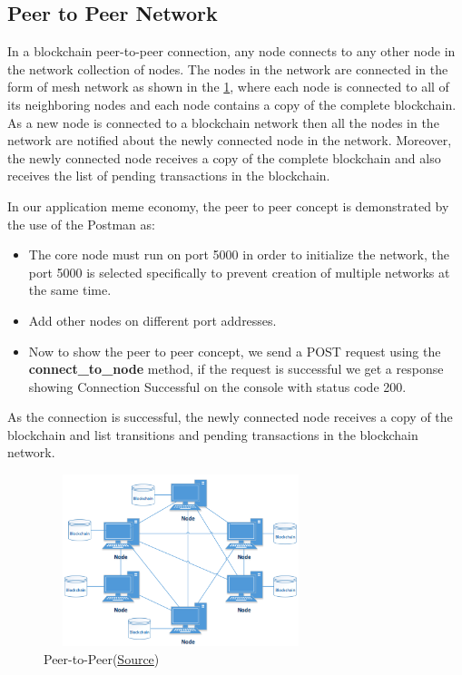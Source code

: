 \documentclass[12pt]{article}
\begin{document}
\subsection{Peer to Peer Network} %
In a blockchain peer-to-peer connection, any node connects to any other node in the network collection of nodes. The nodes in the network are connected in the form of mesh network as shown in the \ref{fig:P2P}, where each node is connected to all of its neighboring nodes and each node contains a copy of the complete blockchain. As a new node is connected to a blockchain network then all the nodes in the network are notified about the newly connected node in the network. Moreover, the newly connected node receives a copy of the complete blockchain and also receives the list of pending transactions in the blockchain. \par
\begin{flushleft}

In our application meme economy, the peer to peer concept is demonstrated by the use of the Postman as:
\begin{itemize}
    \item The core node must run on port 5000 in order to initialize the network, the port 5000 is selected specifically to prevent creation of multiple networks at the same time.
    \item Add other nodes on different port addresses.
    \item Now to show the peer to peer concept, we send a POST request using the \textbf{connect\_to\_node} method, if the request is successful we get a response showing Connection Successful on the console with status code 200.
\end{itemize}
\end{flushleft}
As the connection is successful, the newly connected node receives a copy of the blockchain and list transitions and pending transactions in the blockchain network.
\begin{figure}[H]
    \centering
    \includegraphics[width=8cm, height=5cm]{../report_MemeEcon/images/p2p.png}
    \caption{Peer-to-Peer(\href{https://www.researchgate.net/publication/320127088_Blockchain_Implementation_Quality_Challenges_A_Literature_Review/figures?lo=1&utm_source=google&utm_medium=organic}{Source})}
    \label{fig:P2P}
\end{figure}
\end{document}
